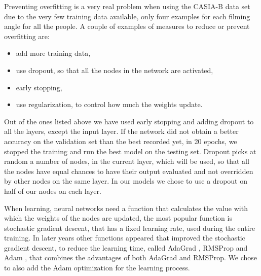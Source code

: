 \documentclass[12pt]{article}
\theoremstyle{definition}
\begin{document}
	Preventing overfitting is a very real problem when using the CASIA-B data set \cite{casia1}\cite{casia2}\cite{casia3} due to the very few training data available, only four examples for each filming angle for all the people. A couple of examples of measures to reduce or prevent overfitting are:
	\begin{itemize}
		\item add more training data,
		\item use dropout, so that all the nodes in the network are activated,
		\item early stopping,
		\item use regularization, to control how much the weights update.
	\end{itemize}

	Out of the ones listed above we have used early stopping and adding dropout to all the layers, except the input layer. If the network did not obtain a better accuracy on the validation set than the best recorded yet, in 20 epochs, we stopped the training and run the best model on the testing set. Dropout picks at random a number of nodes, in the current layer, which will be used, so that all the nodes have equal chances to have their output evaluated and not overridden by other nodes on the same layer. In our models we chose to use a dropout on half of our nodes on each layer.

	When learning, neural networks need a function that calculates the value with which the weights of the nodes are updated, the most popular function is stochastic gradient descent, that has a fixed learning rate, used during the entire training. In later years other functions appeared that improved the stochastic gradient descent, to reduce the learning time, called AdaGrad \cite{adagrad-optimizer}, RMSProp \cite{rmsprop-optimizer} and Adam \cite{adam-optimizer}, that combines the advantages of both AdaGrad and RMSProp.
	We chose to also add the Adam optimization for the learning process.
\end{document}
